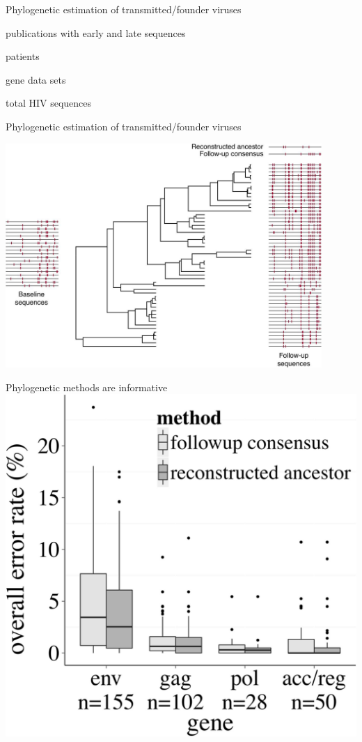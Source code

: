 \documentclass{beamer}
\begin{document}
\begin{frame}{Phylogenetic estimation of transmitted/founder viruses}
    \begin{description}
        \setlength{\itemsep}{16pt}
        \item [{\Huge55}] publications with early and late sequences
        \item [{\Huge232}] patients
        \item [{\Huge335}] gene data sets
        \item [{\Huge19,486}] total HIV sequences
    \end{description}
\end{frame}

\begin{frame}{Phylogenetic estimation of transmitted/founder viruses}
    \begin{center}
        \includegraphics[width=0.9\textwidth]{mccloskey2014evaluation_f1}
    \end{center}
\end{frame}

\begin{frame}{Phylogenetic methods are informative}
    \includegraphics[height=\textheight]{mccloskey2014evaluation_f2}
\end{frame}
\end{document}
